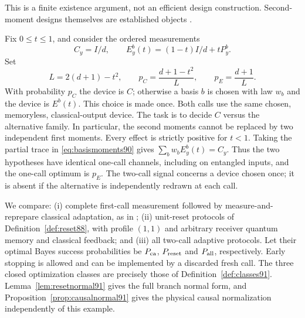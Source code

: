 This is a finite existence argument, not an efficient design construction.
Second-moment designs themselves are established objects \cite{GAE90}.

Fix $0\le t\le1$, and consider the ordered measurements
\begin{equation}\label{eq:gamefamily90}
 C_y=I/d,\qquad E_y^b(t)=(1-t)I/d+tP_y^b.
\end{equation}
Set
\begin{equation}\label{eq:gameprior90}
 L=2(d+1)-t^2,\qquad
 p_C=\frac{d+1-t^2}{L},\qquad p_E=\frac{d+1}{L}.
\end{equation}
With probability $p_C$ the device is $C$; otherwise a basis $b$ is chosen
with law $w_b$ and the device is $E^b(t)$.  This choice is made once.
Both calls use the same chosen, memoryless, classical-output device.
The task is to decide $C$ versus the alternative family.  In particular,
the second moments cannot be replaced by two independent first moments.
Every effect is strictly positive for $t<1$.
Taking the partial trace in \eqref{eq:basismoments90} gives
$\sum_b w_bE_y^b(t)=C_y$.  Thus the two hypotheses have identical
one-call channels, including on entangled inputs, and the one-call
optimum is $p_E$.  The two-call signal concerns a device chosen once;
it is absent if the alternative is independently redrawn at each call.

We compare: (i) complete first-call measurement followed by
measure-and-reprepare classical adaptation, as in
\cite[Definition~23]{OZNPQ89}; (ii) unit-reset protocols of
Definition~\ref{def:reset88}, with profile $(1,1)$ and arbitrary receiver
quantum memory and classical feedback; and (iii) all two-call adaptive
protocols.  Let their optimal Bayes success probabilities be
$P_{\rm ca}$, $P_{\rm reset}$ and $P_{\rm all}$, respectively.
Early stopping is allowed and can be implemented by a discarded fresh call.
The three closed optimization classes are precisely those of
Definition~\ref{def:classes91}.  Lemma~\ref{lem:resetnormal91} gives
the full branch normal form, and Proposition~\ref{prop:causalnormal91}
gives the physical causal normalization independently of this example.

